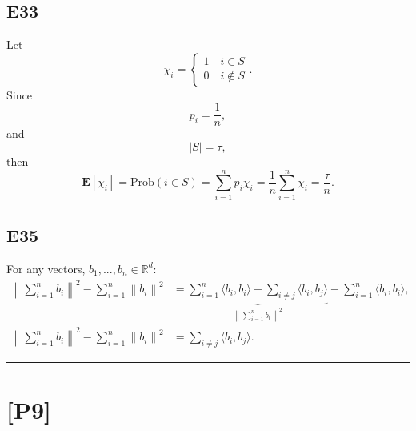 \documentclass[12pt]{article}
\begin{document}
\subsection*{E33}
Let
\begin{equation*}
    \chi_i = 
    \begin{cases}
        1 \quad i \in S\\
        0 \quad i \notin S
    \end{cases}
    .
\end{equation*}
Since
\begin{equation*}
    p_i = \frac{1}{n},
\end{equation*}
and
\begin{equation*}
    |S| = \tau,
\end{equation*}
then 
\begin{equation*}
    \textbf{E}[\chi_i] = \text{Prob}(i \in S) = \sum^n_{i=1} p_i \chi_i = \frac{1}{n} \sum^n_{i=1} \chi_i = \frac{\tau}{n}.
\end{equation*}

\subsection*{E35}
For any vectors, $b_1, ..., b_n \in \mathbb{R}^d$:
\begin{equation*}
    \begin{split}
        \left\|\sum^n_{i=1} b_i \right\|^2 - \sum^n_{i=1}  \left\| b_i \right\|^2 &= \underbrace{\sum^n_{i=1} \langle b_i, b_i\rangle + \sum_{i \neq j} \langle b_i, b_j \rangle}_{\left\|\sum^n_{i=1} b_i \right\|^2} - \sum^n_{i=1} \langle b_i, b_i\rangle, \\
        \left\|\sum^n_{i=1} b_i \right\|^2 - \sum^n_{i=1}  \left\| b_i \right\|^2 &= \sum_{i \neq j} \langle b_i, b_j \rangle.
    \end{split}
\end{equation*}

\hrule
\vspace{0.1cm}
\section*{[P9]}
\end{document}
